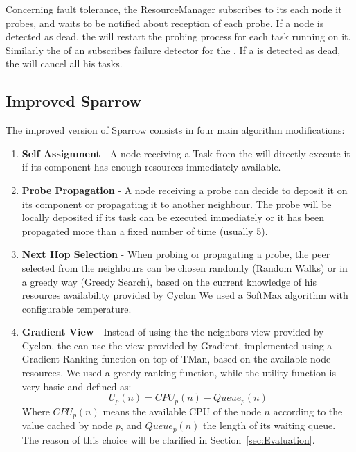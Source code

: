 \documentclass[conference]{IEEEtran}
\begin{document}
  Concerning fault tolerance, the ResourceManager subscribes to its
  \FailureDetector each node it probes, and waits to be notified about
  reception of each probe. If a node is detected as dead, the \tmast will restart the
  probing process for each task running on it. Similarly the \RmWorker of
  an \exc subscribes failure detector for the \tmast. If a \tmast is
  detected as dead, the \RmWorker will cancel all his tasks.

  \subsection{Improved Sparrow}

  The improved version of Sparrow consists in four main algorithm
  modifications:
  
  \begin{enumerate}

    \item \textbf{Self Assignment} - A node receiving a Task
      from the \dc will directly execute it if its \RmWorker
      component has enough resources immediately available.

    \item \textbf{Probe Propagation} - A node receiving a probe
      can decide to deposit it on its \RmWorker component or propagating
      it to another neighbour.  The probe will be locally deposited if its
      task can be executed immediately or it has been propagated more than
      a fixed number of time (usually 5). %

    \item \textbf{Next Hop Selection} - When probing or propagating a
      probe, the peer selected from the neighbours can be chosen randomly
      (Random Walks) or in a greedy way (Greedy Search), based on the
      current knowledge of his resources availability provided by Cyclon
      We used a SoftMax algorithm with configurable temperature.

    \item \textbf{Gradient View} - Instead of using the the neighbors
      view provided by Cyclon, the \ResourceManager can use the view
      provided by Gradient, implemented using a Gradient Ranking function
      on top of TMan, based on the available node resources. We used a
      greedy ranking function, while the utility function is very basic
      and defined as:
      \[
      U_p(n) = CPU_p(n) - Queue_p(n)
      \]
      Where $CPU_p(n)$ means the available CPU of the node
      $n$ according to the value cached by node $p$, and $Queue_p(n)$ the
      length of its waiting queue. The reason of this choice will be
      clarified in Section~\ref{sec:Evaluation}.

  \end{enumerate}
\end{document}
